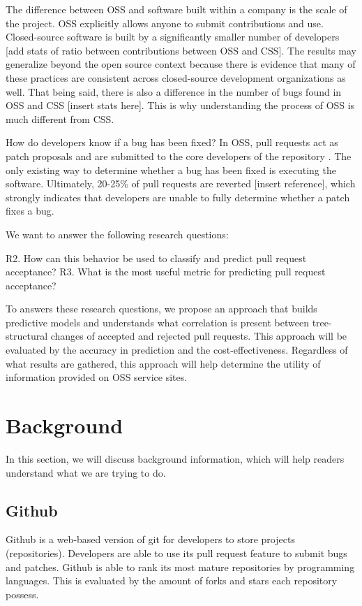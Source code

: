 \documentclass[10pt, conference]{IEEEtran}
\begin{document}
The difference between OSS and software built within a company is the scale of the project. OSS explicitly allows anyone to submit contributions and use. Closed-source software is built by a significantly smaller number of developers [add stats of ratio between contributions between OSS and CSS]. The results may generalize beyond the open source context because there is evidence that many of these practices are consistent across closed-source development organizations as well. That being said, there is also a difference in the number of bugs found in OSS and CSS [insert stats here]. This is why understanding the process of OSS is much different from CSS.

How do developers know if a bug has been fixed? In OSS, pull requests act as patch proposals and are submitted to the core developers of the repository \cite{IEEEhowto:kopka}. The only existing way to determine whether a bug has been fixed is executing the software. Ultimately, 20-25\% of pull requests are reverted [insert reference], which strongly indicates that developers are unable to fully determine whether a patch fixes a bug.

We want to answer the following research questions:

\par
R2. How can this behavior be used to classify and predict pull request acceptance?
R3. What is the most useful metric for predicting pull request acceptance?

To answers these research questions, we propose an approach that builds predictive models and understands what correlation is present between tree-structural changes of accepted and rejected pull requests. This approach will be evaluated by the accuracy in prediction and the cost-effectiveness. Regardless of what results are gathered, this approach will help determine the utility of information provided on OSS service sites.

\section{Background}
In this section, we will discuss background information, which will help readers understand what we are trying to do.

\subsection{Github}
Github is a web-based version of git for developers to store projects (repositories). Developers are able to use its pull request feature to submit bugs and patches. Github is able to rank its most mature repositories by programming languages. This is evaluated by the amount of forks and stars each repository possess. 
\end{document}
